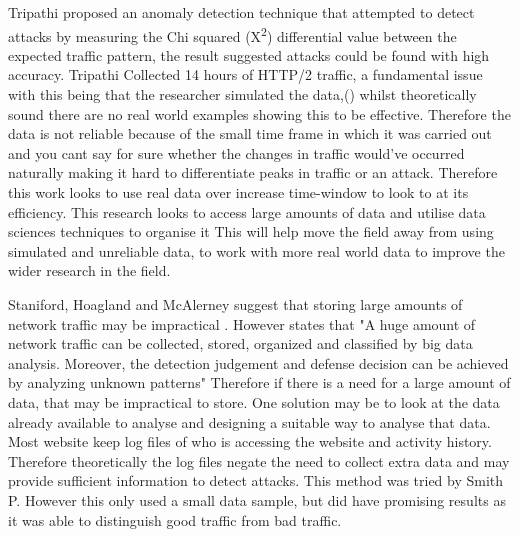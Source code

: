  
 Tripathi proposed an anomaly detection technique that attempted to detect attacks by measuring the Chi squared (X\textsuperscript{\small2}) differential value between the expected traffic pattern, the result suggested attacks could be found with high accuracy. Tripathi Collected 14 hours of HTTP/2 traffic, a fundamental issue with this being that the researcher simulated the data,(\cite{tripathi2018slow}) whilst theoretically sound there are no real world examples showing this to be effective. Therefore the data is not reliable because of the small time frame in which it was carried out and you cant say for sure whether the changes in traffic would've occurred naturally making it hard to differentiate peaks in traffic or an attack. Therefore this work looks to use real data over increase time-window to look to at its efficiency. This research looks to access large amounts of data and utilise data sciences techniques to organise it This will help move the field away from using simulated and unreliable data, to work with more real world data to improve the wider research in the field. 

Staniford, Hoagland and McAlerney suggest that storing large amounts of network traffic may be impractical \cite{staniford2002practical}. However \citeauthor{9016229} states that "A huge amount of network traffic can be collected, stored, organized and classified by big data analysis. Moreover, the detection judgement and defense decision can be achieved by analyzing unknown patterns" \cite{9016229} Therefore if there is a need for a large amount of data, that may be impractical to store. One solution may be to look at the data already available to analyse and designing a suitable way to analyse that data. Most website keep log files of who is accessing the website and activity history. Therefore theoretically the log files negate the need to collect extra data and may provide sufficient information to detect attacks. This method was tried by Smith P. However this only used a small data sample, but did have promising results as it was able to distinguish good traffic from bad traffic. 

